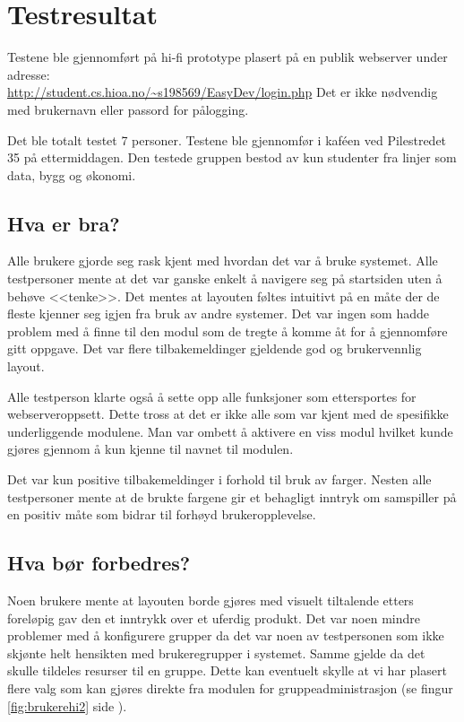 \section{Testresultat}
Testene ble gjennomført på hi-fi prototype plasert på en publik webserver under adresse:\\ \url{http://student.cs.hioa.no/~s198569/EasyDev/login.php} 
Det er ikke nødvendig med brukernavn eller passord for pålogging.

Det ble totalt testet 7 personer. Testene ble gjennomfør i kaféen ved Pilestredet 35 på ettermiddagen. Den testede gruppen bestod av kun studenter fra linjer som data, bygg og økonomi.

\subsection{Hva er bra?}
Alle brukere gjorde seg rask kjent med hvordan det var å bruke systemet. Alle testpersoner mente at det var ganske enkelt å navigere seg på startsiden uten å behøve <<tenke>>. Det mentes at layouten føltes intuitivt på en måte der de fleste kjenner seg igjen fra bruk av andre systemer. Det var ingen som hadde problem med å finne til den modul som de tregte å komme åt for å gjennomføre gitt oppgave.
Det var flere tilbakemeldinger gjeldende god og brukervennlig layout.

Alle testperson klarte også å sette opp alle funksjoner som ettersportes for webserveroppsett. Dette tross at det er ikke alle som var kjent med de spesifikke underliggende modulene. Man var ombett å aktivere en viss modul hvilket kunde gjøres gjennom å kun kjenne til navnet til modulen.

Det var kun positive tilbakemeldinger i forhold til bruk av farger. Nesten alle testpersoner mente at de brukte fargene gir et behagligt inntryk om samspiller på en positiv måte som bidrar til forhøyd brukeropplevelse.

\subsection{Hva bør forbedres?}
Noen brukere mente at layouten borde gjøres med visuelt tiltalende etters foreløpig gav den et inntrykk over et uferdig produkt.
Det var noen mindre problemer med å konfigurere grupper da det var noen av testpersonen som ikke skjønte helt hensikten med brukeregrupper i systemet. Samme gjelde da det skulle tildeles resurser til en gruppe. Dette kan eventuelt skylle at vi har plasert flere valg som kan gjøres direkte fra modulen for gruppeadministrasjon (se fingur \ref{fig:brukerehi2} side \pageref{fig:brukerehi2}).

